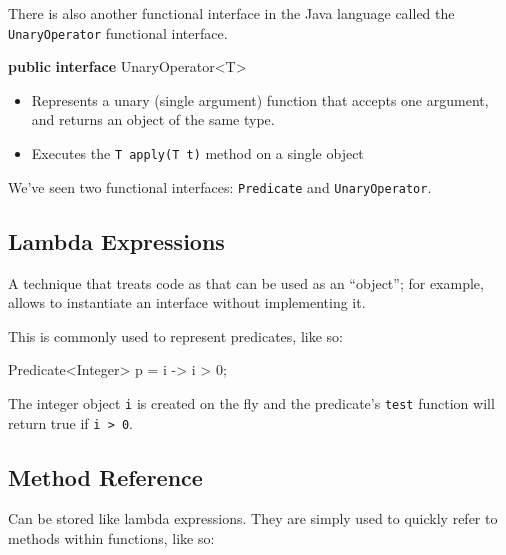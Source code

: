 \documentclass[]{article}
\newenvironment{Shaded}{}{}
\newcommand{\BuiltInTok}[1]{#1}
\newcommand{\DecValTok}[1]{\textcolor[rgb]{0.25,0.63,0.44}{#1}}
\newcommand{\KeywordTok}[1]{\textcolor[rgb]{0.00,0.44,0.13}{\textbf{#1}}}
\newcommand{\NormalTok}[1]{#1}
\providecommand{\tightlist}{%
  \setlength{\itemsep}{0pt}\setlength{\parskip}{0pt}}
\begin{document}
There is also another functional interface in the Java language called
the \texttt{UnaryOperator} functional interface.

\begin{Shaded}
\begin{Highlighting}[]
\KeywordTok{public} \KeywordTok{interface}\NormalTok{ UnaryOperator<T>}
\end{Highlighting}
\end{Shaded}

\begin{itemize}
\tightlist
\item
  Represents a unary (single argument) function that accepts one
  argument, and returns an object of the same type.
\item
  Executes the \texttt{T\ apply(T\ t)} method on a single object
\end{itemize}

We've seen two functional interfaces: \texttt{Predicate} and
\texttt{UnaryOperator}.

\hypertarget{lambda-expressions}{%
\subsection{Lambda Expressions}\label{lambda-expressions}}

A technique that treats code as that can be used as an ``object''; for
example, allows to instantiate an interface without implementing it.

This is commonly used to represent predicates, like so:

\begin{Shaded}
\begin{Highlighting}[]
\BuiltInTok{Predicate}\NormalTok{<}\BuiltInTok{Integer}\NormalTok{> p = i -> i > }\DecValTok{0}\NormalTok{;}
\end{Highlighting}
\end{Shaded}

The integer object \texttt{i} is created on the fly and the predicate's
\texttt{test} function will return true if
\texttt{i\ \textgreater{}\ 0}.

\hypertarget{method-reference}{%
\subsection{Method Reference}\label{method-reference}}

Can be stored like lambda expressions. They are simply used to quickly
refer to methods within functions, like so:
\end{document}
